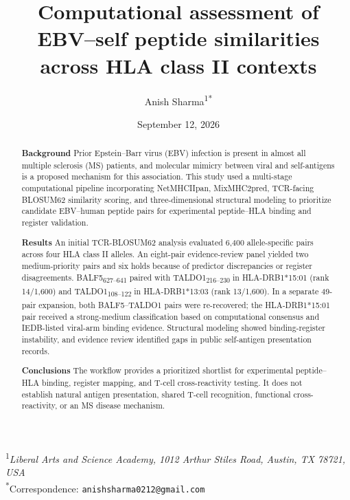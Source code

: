 \documentclass[11pt]{article}
\title{Computational assessment of EBV--self peptide similarities across HLA class II contexts}
\author{Anish Sharma\textsuperscript{1*}}
\date{September 12, 2026}
\begin{document}
\maketitle
\begin{center}
\small \textsuperscript{1}\textit{Liberal Arts and Science Academy, 1012 Arthur Stiles Road, Austin, TX 78721, USA}\\
\small \textsuperscript{*}Correspondence: \texttt{anishsharma0212@gmail.com}
\end{center}

\begin{abstract}
\textbf{Background} Prior Epstein--Barr virus (EBV) infection is present in almost all multiple sclerosis (MS) patients, and molecular mimicry between viral and self-antigens is a proposed mechanism for this association. This study used a multi-stage computational pipeline incorporating NetMHCIIpan, MixMHC2pred, TCR-facing BLOSUM62 similarity scoring, and three-dimensional structural modeling to prioritize candidate EBV--human peptide pairs for experimental peptide--HLA binding and register validation.

\textbf{Results} An initial TCR-BLOSUM62 analysis evaluated 6,400 allele-specific pairs across four HLA class II alleles. An eight-pair evidence-review panel yielded two medium-priority pairs and six holds because of predictor discrepancies or register disagreements. BALF5\textsubscript{627--641} paired with TALDO1\textsubscript{216--230} in HLA-DRB1*15:01 (rank 14/1,600) and TALDO1\textsubscript{108--122} in HLA-DRB1*13:03 (rank 13/1,600). In a separate 49-pair expansion, both BALF5--TALDO1 pairs were re-recovered; the HLA-DRB1*15:01 pair received a strong-medium classification based on computational consensus and IEDB-listed viral-arm binding evidence. Structural modeling showed binding-register instability, and evidence review identified gaps in public self-antigen presentation records.

\textbf{Conclusions} The workflow provides a prioritized shortlist for experimental peptide--HLA binding, register mapping, and T-cell cross-reactivity testing. It does not establish natural antigen presentation, shared T-cell recognition, functional cross-reactivity, or an MS disease mechanism.
\end{abstract}
\end{document}
